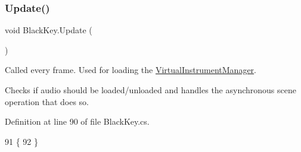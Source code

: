 \subsubsection{\texorpdfstring{Update()}{Update()}}
{\footnotesize\ttfamily void Black\+Key.\+Update (\begin{DoxyParamCaption}{ }\end{DoxyParamCaption})\hspace{0.3cm}{\ttfamily [private]}}



Called every frame. Used for loading the \hyperlink{class_virtual_instrument_manager}{Virtual\+Instrument\+Manager}. 

Checks if audio should be loaded/unloaded and handles the asynchronous scene operation that does so. 

Definition at line 90 of file Black\+Key.\+cs.


\begin{DoxyCode}
91     \{
92     \}
\end{DoxyCode}
